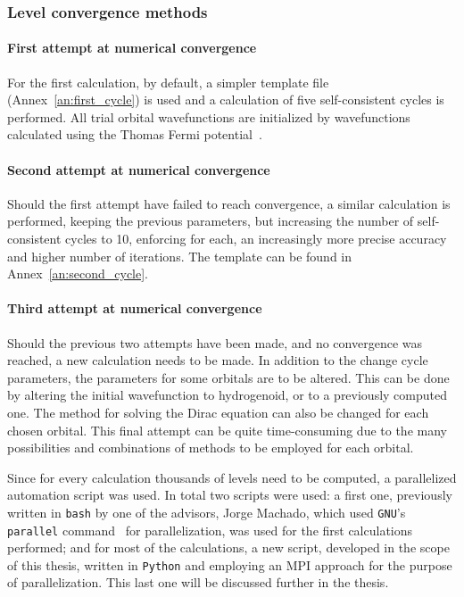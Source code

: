 \subsubsection{Level convergence methods}

\paragraph{First attempt at numerical convergence}
For the first calculation, by default, a simpler template file (Annex~\ref{an:first_cycle}) is used and a calculation of five self-consistent cycles is performed. All  trial orbital wavefunctions are initialized by wavefunctions calculated using the Thomas Fermi potential~\cite{thomas_1927}.





\paragraph{Second attempt at numerical convergence}
Should the first attempt have failed to reach convergence, a similar calculation is performed, keeping the previous parameters, but increasing the number of self-consistent cycles to 10, enforcing for each, an increasingly more precise accuracy and higher number of iterations. The template can be found in Annex~\ref{an:second_cycle}.


\paragraph{Third attempt at numerical convergence}
Should the previous two attempts have been made, and no convergence was reached, a new calculation needs to be made. In addition to the change cycle parameters, the parameters for some orbitals are to be altered. This can be done by altering the initial wavefunction to hydrogenoid, or to a previously computed one. The method for solving the Dirac equation can also be changed for each chosen orbital. This final attempt can be quite time-consuming due to the many possibilities and combinations of methods to be employed for each orbital.


Since for every calculation thousands of levels need to be computed, a parallelized automation script was used. In total two scripts were used: a first one, previously written in \verb|bash| by one of the advisors, Jorge Machado, which used \verb|GNU|'s \verb|parallel|  command~\cite{Tange2011a} for parallelization, was used for the first calculations performed; and for most of the calculations, a new script, developed in the scope of this thesis, written in \verb|Python| and employing an \gls{MPI} approach for the purpose of parallelization. This last one will be discussed further in the thesis.

